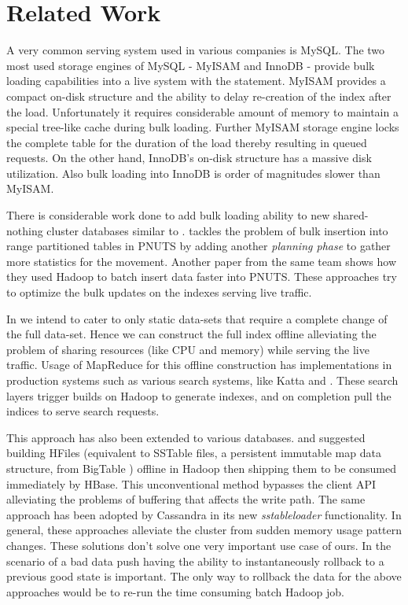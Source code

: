 \section{Related Work}
\label{sec:related_work}
A very common serving system used in various companies is MySQL\cite{mysql}. The two most used storage engines of MySQL - MyISAM\cite{myisam} and InnoDB\cite{innodb} - provide bulk loading capabilities into a live system with the  statement. MyISAM provides a compact on-disk structure and the ability to delay re-creation of the index after the load\cite{bulk}.  Unfortunately it requires considerable amount of memory to maintain a special tree-like cache during bulk loading. 
Further MyISAM storage engine locks the complete table for the duration of the load thereby resulting in queued requests. On the other hand, InnoDB's on-disk structure has a massive disk utilization. Also bulk loading into InnoDB is order of magnitudes slower than MyISAM. 

There is considerable work done to add bulk loading ability to new shared-nothing cluster\cite{sharednothing} databases similar to \projectname{}. \cite{silberstein} tackles the problem of bulk insertion into range partitioned tables in PNUTS\cite{pnuts} by adding another \emph {planning phase} to gather more statistics for the movement. Another paper from the same team \cite{pnutsbatch} shows how they used Hadoop to batch insert data faster into PNUTS. These approaches try to optimize the bulk updates on the indexes serving live traffic. 

In \projectname{} we intend to cater to only static data-sets that require a complete change of the full data-set. Hence we can construct the full index offline alleviating the problem of sharing resources (like CPU and memory) while serving the live traffic. Usage of MapReduce for this offline construction has implementations in production systems such as various search systems, like Katta\cite{katta} and \cite{mika}. These search layers trigger builds on Hadoop to generate indexes, and on completion pull the indices to serve search requests. 

This approach has also been extended to various databases. \cite{konstantinou} and \cite{barbuzzi} suggested building HFiles (equivalent to SSTable files, a persistent immutable map data structure, from BigTable \cite{bigtable}) offline in Hadoop then shipping them to be consumed immediately by HBase\cite{hbase}. This unconventional method bypasses the client API alleviating the problems of buffering that affects the write path. The same approach has been adopted by Cassandra\cite{cassandra} in its new \emph{sstableloader}\cite{cassandra_bulk} functionality. In general, these approaches alleviate the cluster from sudden memory usage pattern changes. These solutions don't solve one very important use case of ours. In the scenario of a bad data push having the ability to instantaneously rollback to a previous good state is important. The only way to rollback the data for the above approaches would be to re-run the time consuming batch Hadoop job.

